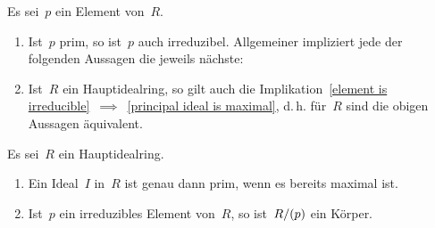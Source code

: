 \begin{proposition}
  \label{connection between prime and irreducible}
  Es sei~$p$ ein Element von~$R$.
  \begin{enumerate}
    \item
      Ist~$p$ prim, so ist~$p$ auch irreduzibel.
      Allgemeiner impliziert jede der folgenden Aussagen die jeweils nächste:
    \item
      Ist~$R$ ein Hauptidealring, so gilt auch die Implikation~\ref{element is irreducible}~$\implies$~\ref{principal ideal is maximal}, d.\,h. für~$R$ sind die obigen Aussagen äquivalent.
  \end{enumerate}
\end{proposition}

\begin{corollary}
  Es sei~$R$ ein Hauptidealring.
  \begin{enumerate}
    \item
      Ein Ideal~$I$ in~$R$ ist genau dann prim, wenn es bereits maximal ist.
    \item
      Ist~$p$ ein irreduzibles Element von~$R$, so ist~$R / (p)$ ein Körper.
  \end{enumerate}
\end{corollary}

